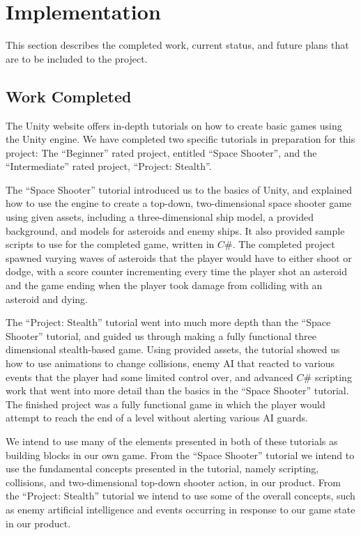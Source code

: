 \documentclass[12pt]{article}       %
\def\hs{\hspace{15pt}}
\begin{document}
\section{Implementation} %
\label{sec:history}
This section describes the completed work, current status, and future plans that are to be included to the project.

\subsection{Work Completed}

\hs The Unity website offers in-depth tutorials on how to create basic games using the Unity engine. We have completed two specific tutorials in preparation for this project: The “Beginner” rated project, entitled “Space Shooter”, and the “Intermediate” rated project, “Project: Stealth”.

  The “Space Shooter” tutorial introduced us to the basics of Unity, and explained how to use the engine to create a top-down, two-dimensional space shooter game using given assets, including a three-dimensional ship model, a provided background, and models for asteroids and enemy ships. It also provided sample scripts to use for the completed game, written in $C\#$. The completed project spawned varying waves of asteroids that the player would have to either shoot or dodge, with a score counter incrementing every time the player shot an asteroid and the game ending when the player took damage from colliding with an asteroid and dying.

 The “Project: Stealth” tutorial went into much more depth than the “Space Shooter” tutorial, and guided us through making a fully functional three dimensional stealth-based game. Using provided assets, the tutorial showed us how to use animations to change collisions, enemy AI that reacted to various events that the player had some limited control over, and advanced $C\#$ scripting work that went into more detail than the basics in the “Space Shooter” tutorial. The finished project was a fully functional game in which the player would attempt to reach the end of a level without alerting various AI guards.

  We intend to use many of the elements presented in both of these tutorials as building blocks in our own game. From the “Space Shooter” tutorial we intend to use the fundamental concepts presented in the tutorial, namely scripting, collisions, and two-dimensional top-down shooter action, in our product. From the “Project: Stealth” tutorial we intend to use some of the overall concepts, such as enemy artificial intelligence and events occurring in response to our game state in our product.
\end{document}
